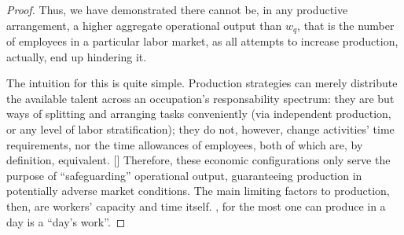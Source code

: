 \documentclass[hidelinks, nonatbib]{elsarticle}
\begin{document}
\begin{lemma}
\begin{proof}
        Thus, we have demonstrated there cannot be, in any productive arrangement, a higher aggregate operational output than $w_q$, that is the number of employees in a particular labor market, as all attempts to increase production, actually, end up hindering it. 
        
        The intuition for this is quite simple. Production strategies can merely distribute the available talent across an occupation's responsability spectrum: they are but ways of splitting and arranging tasks conveniently (via independent production, or any level of labor stratification); they do not, however, change activities' time requirements, nor the time allowances of employees, both of which are, by definition, equivalent. [] Therefore, these economic configurations only serve the purpose of ``safeguarding'' operational output, guaranteeing production in potentially adverse market conditions. The main limiting factors to production, then, are workers' capacity and time itself.
        , for the most one can produce in a day is a ``day's work''.
    \end{proof}
\end{lemma}
\end{document}
